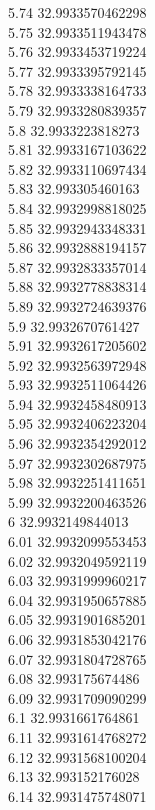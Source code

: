 {5.74	32.9933570462298\\
5.75	32.9933511943478\\
5.76	32.9933453719224\\
5.77	32.9933395792145\\
5.78	32.9933338164733\\
5.79	32.9933280839357\\
5.8	32.9933223818273\\
5.81	32.9933167103622\\
5.82	32.9933110697434\\
5.83	32.993305460163\\
5.84	32.9932998818025\\
5.85	32.9932943348331\\
5.86	32.9932888194157\\
5.87	32.9932833357014\\
5.88	32.9932778838314\\
5.89	32.9932724639376\\
5.9	32.9932670761427\\
5.91	32.9932617205602\\
5.92	32.9932563972948\\
5.93	32.9932511064426\\
5.94	32.9932458480913\\
5.95	32.9932406223204\\
5.96	32.9932354292012\\
5.97	32.9932302687975\\
5.98	32.9932251411651\\
5.99	32.9932200463526\\
6	32.9932149844013\\
6.01	32.9932099553453\\
6.02	32.9932049592119\\
6.03	32.9931999960217\\
6.04	32.9931950657885\\
6.05	32.9931901685201\\
6.06	32.9931853042176\\
6.07	32.9931804728765\\
6.08	32.993175674486\\
6.09	32.9931709090299\\
6.1	32.9931661764861\\
6.11	32.9931614768272\\
6.12	32.9931568100204\\
6.13	32.993152176028\\
6.14	32.9931475748071\\
}
